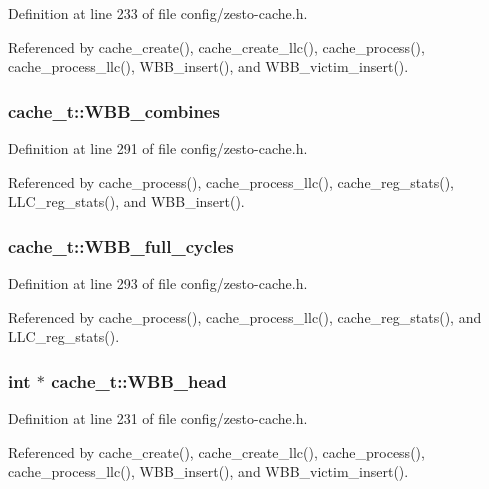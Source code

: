 Definition at line 233 of file config/zesto-cache.h.

Referenced by cache\_\-create(), cache\_\-create\_\-llc(), cache\_\-process(), cache\_\-process\_\-llc(), WBB\_\-insert(), and WBB\_\-victim\_\-insert().
\subsubsection[{WBB\_\-combines}]{ {\bf cache\_\-t::WBB\_\-combines}}\label{structcache__t_dee5a52815654047876730b81fecc4dd}




Definition at line 291 of file config/zesto-cache.h.

Referenced by cache\_\-process(), cache\_\-process\_\-llc(), cache\_\-reg\_\-stats(), LLC\_\-reg\_\-stats(), and WBB\_\-insert().
\subsubsection[{WBB\_\-full\_\-cycles}]{ {\bf cache\_\-t::WBB\_\-full\_\-cycles}}\label{structcache__t_2af0d41347cf21e92b6e2c9e4cc297af}




Definition at line 293 of file config/zesto-cache.h.

Referenced by cache\_\-process(), cache\_\-process\_\-llc(), cache\_\-reg\_\-stats(), and LLC\_\-reg\_\-stats().
\subsubsection[{WBB\_\-head}]{\setlength{\rightskip}{0pt plus 5cm}int $\ast$ {\bf cache\_\-t::WBB\_\-head}}\label{structcache__t_eb30d62950574247b50eac7eadafa492}




Definition at line 231 of file config/zesto-cache.h.

Referenced by cache\_\-create(), cache\_\-create\_\-llc(), cache\_\-process(), cache\_\-process\_\-llc(), WBB\_\-insert(), and WBB\_\-victim\_\-insert().
